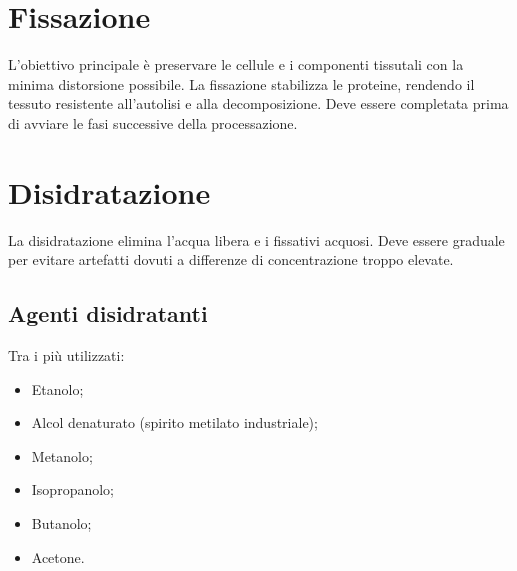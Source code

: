 


\section{Fissazione}
L’obiettivo principale è preservare le cellule e i componenti tissutali con la minima distorsione possibile.  
La fissazione stabilizza le proteine, rendendo il tessuto resistente all’autolisi e alla decomposizione. Deve essere completata prima di avviare le fasi successive della processazione.



\section{Disidratazione}
La disidratazione elimina l’acqua libera e i fissativi acquosi. Deve essere graduale per evitare artefatti dovuti a differenze di concentrazione troppo elevate.

\subsection{Agenti disidratanti}
Tra i più utilizzati:
\begin{itemize}
    \item Etanolo;
    \item Alcol denaturato (spirito metilato industriale);
    \item Metanolo;
    \item Isopropanolo;
    \item Butanolo;
    \item Acetone.
\end{itemize}

